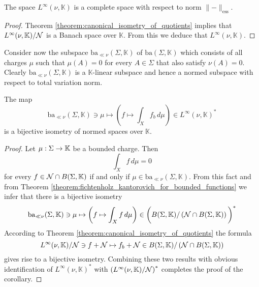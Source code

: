 \begin{corollary}\label{corollary:L_infty_is_complete}
    The space $L^{\infty}(\nu,\mathbb{K})$ is a complete space with respect to norm $\lVert - \rVert_{\mathrm{ess}}$.
\end{corollary}
\begin{proof}
    Theorem \ref{theorem:canonical_isometry_of_quotients} implies that $L^{\infty}(\nu,\mathbb{K})/{\mathcal N}$ is a Banach space over $\mathbb{K}$. From this we deduce that $L^{\infty}(\nu,\mathbb{K})$.
\end{proof}
\noindent
Consider now the subspace $\mathrm{ba}_{\ll \nu}(\Sigma, \mathbb{K})$ of $\mathrm{ba}(\Sigma, \mathbb{K})$ which consists of all charges $\mu$ such that $\mu(A) = 0$ for every $A \in \Sigma$ that also satisfy $\nu(A) = 0$. Clearly $\mathrm{ba}_{\ll \nu}(\Sigma, \mathbb{K})$ is a $\mathbb{K}$-linear subspace and hence a normed subspace with respect to total variation norm.

\begin{corollary}\label{corollary:functionals_for_L_infinity}
The map
$$\mathrm{ba}_{\ll \nu}(\Sigma, \mathbb{K}) \ni \mu \mapsto \left(f \mapsto \int_X f_b\,d\mu\right) \in L^{\infty}(\nu,\mathbb{K})^*$$
is a bijective isometry of normed spaces over $\mathbb{K}$.
\end{corollary}
\begin{proof}
Let $\mu:\Sigma \rightarrow \mathbb{K}$ be a bounded charge. Then 
$$\int_Xf\,d\mu = 0$$
for every $f \in {\mathcal N} \cap B(\Sigma,\mathbb{K})$ if and only if $\mu \in \mathrm{ba}_{\ll \nu}(\Sigma, \mathbb{K})$. From this fact and from Theorem \ref{theorem:fichtenholz_kantorovich_for_bounded_functions} we infer that there is a bijective isometry
$$\mathrm{ba}_{\ll \nu}(\Sigma, \mathbb{K}) \ni \mu \mapsto \left(f \mapsto \int_Xf\,d\mu\right) \in 
\bigg(B(\Sigma,\mathbb{K})/\left({\mathcal N}\cap B(\Sigma,\mathbb{K})\right)\bigg)^*$$
According to Theorem \ref{theorem:canonical_isometry_of_quotients} the formula
$$L^{\infty}(\nu,\mathbb{K})/{\mathcal N} \ni f + {\mathcal N} \mapsto f_b + {\mathcal N} \in B(\Sigma,\mathbb{K})/\left({\mathcal N}\cap B(\Sigma,\mathbb{K})\right)$$
gives rise to a bijective isometry. Combining these two results with obvious identification of $L^{\infty}(\nu,\mathbb{K})^*$ with $\left(L^{\infty}(\nu,\mathbb{K})/{\mathcal N}\right)^*$ completes the proof of the corollary.
\end{proof}






\small



